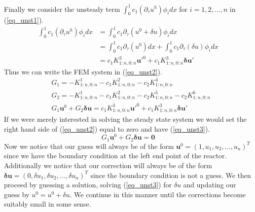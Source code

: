 \documentclass[11pt,fleqn]{article}
\theoremstyle{defstyle}
\begin{document}
Finally we consider the unsteady term $\int_0^1 c_1(\partial_{\tau}u^h)\phi_i dx$ for $i=1,2,...,n$ in (\ref{eq_unst1}).
\begin{equation}
\begin{aligned}
\int_0^1 c_1(\partial_{\tau}u^h)\phi_i dx &= \int_0^1 c_1\partial_{\tau}(u^0 + \delta u) \phi_idx \\
&=  \int_0^1 c_1\partial_{\tau}(u^0)dx + \int_0^1 c_1\partial_{\tau}(\delta u) \phi_idx \\
&= c_1K^3_{1:n,0:n}\mathbf{u}\prime^0 + c_1K^3_{1:n,0:n}\mathbf{\delta u}\prime 
\end{aligned}
\label{eq_unst1}
\end{equation}
Thus we can write the FEM system in (\ref{eq_unst2}).
\begin{equation}
\begin{aligned}
&G_1 = -K^1_{1:n,0:n} -c_1K^2_{1:n,0:n} - c_2K^4_{1:n,0:n} \\ 
&G_2 = -K^1_{1:n,0:n} - c_1K^2_{1:n,0:n} -c_2K^5_{1:n,0:n}  - c_2K^6_{1:n,0:n} \\
&G_1\mathbf{u}^0 + G_2 \mathbf{\delta u} =c_1K^3_{1:n,0:n}\mathbf{u}\prime^0 + c_1K^3_{1:n,0:n}\mathbf{\delta u}\prime
\end{aligned}
\label{eq_unst2}
\end{equation}
If we were merely interested in solving the steady state system we would set the right hand side of (\ref{eq_unst2}) equal to zero and have (\ref{eq_unst3}).
\begin{equation}
G_1\mathbf{u}^0 + G_2 \mathbf{\delta u} = \mathbf{0} 
\label{eq_unst3}
\end{equation}
Now we notice that our guess will always be of the form $\mathbf{u}^0 = \left(1, u_1,u_2,...,u_n \right)^T$ since we have the boundary condition at the left end point of the reactor. Additionally we notice that our correction will always be of the form $\mathbf{\delta u}=\left(0,\delta u_1,\delta u_2,...,\delta u_n \right)^T$ since the boundary condition is not a guess. We then proceed by guessing a solution, solving (\ref{eq_unst3}) for $\delta u$ and updating our guess by $u^0 = u^0 + \delta u$. We continue in this manner until the corrections become suitably small in some sense.  
\end{document}
